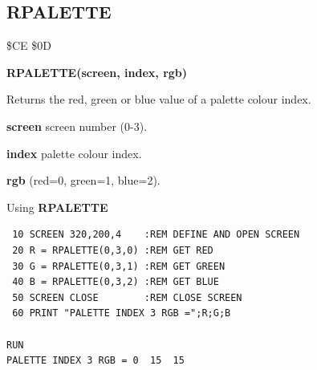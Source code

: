 \subsection{RPALETTE}
\begin{description}[leftmargin=2cm,style=nextline]
\item [Token:] \$CE \$0D
\item [Format:] {\bf RPALETTE(screen, index, rgb)}
\item [Usage:]  Returns the red, green or blue value of
                a palette colour index.

                {\bf screen} screen number (0-3).

                {\bf index} palette colour index.

                {\bf rgb} (red=0, green=1, blue=2).

\item [Example:] Using {\bf RPALETTE}

\begin{tcolorbox}[colback=black,coltext=white]
\verbatimfont{\codefont}
\begin{verbatim}
 10 SCREEN 320,200,4    :REM DEFINE AND OPEN SCREEN
 20 R = RPALETTE(0,3,0) :REM GET RED
 30 G = RPALETTE(0,3,1) :REM GET GREEN
 40 B = RPALETTE(0,3,2) :REM GET BLUE
 50 SCREEN CLOSE        :REM CLOSE SCREEN
 60 PRINT "PALETTE INDEX 3 RGB =";R;G;B

RUN
PALETTE INDEX 3 RGB = 0  15  15
\end{verbatim}
\end{tcolorbox}
\end{description}


\newpage
